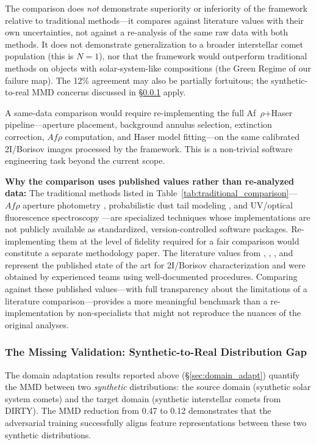 \documentclass[usenatbib]{mnras}
\begin{document}
The comparison does \textit{not} demonstrate superiority or inferiority of the framework relative to traditional methods---it compares against literature values with their own uncertainties, not against a re-analysis of the same raw data with both methods. It does not demonstrate generalization to a broader interstellar comet population (this is $N=1$), nor that the framework would outperform traditional methods on objects with solar-system-like compositions (the Green Regime of our failure map). The 12\% agreement may also be partially fortuitous; the synthetic-to-real MMD concerns discussed in \S\ref{sec:mmd_gap} apply.

A same-data comparison would require re-implementing the full Af~$\rho$+Haser pipeline---aperture placement, background annulus selection, extinction correction, $Af\rho$ computation, and Haser model fitting---on the same calibrated 2I/Borisov images processed by the framework. This is a non-trivial software engineering task beyond the current scope.

\textbf{Why the comparison uses published values rather than re-analyzed data:} The traditional methods listed in Table~\ref{tab:traditional_comparison}---$Af\rho$ aperture photometry \citep{lamy04,ahearn95}, probabilistic dust tail modeling \citep{cremonese20}, and UV/optical fluorescence spectroscopy \citep{bodewits20,opitom21}---are specialized techniques whose implementations are not publicly available as standardized, version-controlled software packages. Re-implementing them at the level of fidelity required for a fair comparison would constitute a separate methodology paper. The literature values from \citet{clements21}, \citet{cremonese20}, \citet{bodewits20}, and \citet{opitom21} represent the published state of the art for 2I/Borisov characterization and were obtained by experienced teams using well-documented procedures. Comparing against these published values---with full transparency about the limitations of a literature comparison---provides a more meaningful benchmark than a re-implementation by non-specialists that might not reproduce the nuances of the original analyses.

\subsubsection{The Missing Validation: Synthetic-to-Real Distribution Gap}\label{sec:mmd_gap}

The domain adaptation results reported above (\S\ref{sec:domain_adapt}) quantify the MMD between two \textit{synthetic} distributions: the source domain (synthetic solar system comets) and the target domain (synthetic interstellar comets from DIRTY). The MMD reduction from 0.47 to 0.12 demonstrates that the adversarial training successfully aligns feature representations between these two synthetic distributions.
\end{document}
